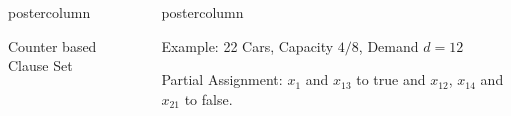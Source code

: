 \documentclass[final]{beamer}
\newlength{\columnheight}
\begin{document}
\begin{frame}
\begin{columns}
\begin{column}{.49\textwidth}
\begin{beamercolorbox}[center,wd=\textwidth]{postercolumn}
\begin{minipage}[T]{.95\textwidth}
{\begin{block}{Counter based Clause Set}
\begin{center}
                \end{center}
            \end{block}
            \vfill
          }
        \end{minipage}
      \end{beamercolorbox}
    \end{column}

    \begin{column}{.49\textwidth}
      \begin{beamercolorbox}[center,wd=\textwidth]{postercolumn}
        \begin{minipage}[T]{.95\textwidth} %
          \parbox[t][\columnheight]{\textwidth}{ %
            
            \begin{block}{Example: 22 Cars, Capacity $4/8$, Demand $d=12$}

                Partial Assignment: $x_{1}$ and $x_{13}$ to true and $x_{12}$, $x_{14}$
                and $x_{21}$ to false.
                

\end{block}}
\end{minipage}
\end{beamercolorbox}
\end{column}
\end{columns}
\end{frame}
\end{document}
